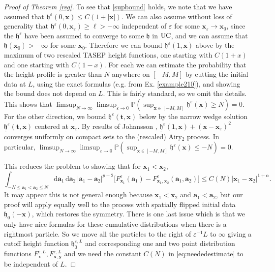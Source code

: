 \documentclass[letterpaper,reqno,11pt,oneside,final]{amsart}
\theoremstyle{definition}
\newcommand{\fh}{\mathfrak{h}}
\newcommand{\pp}{\mathbb{P}}
\newcommand{\ep}{\varepsilon}
\newcommand{\uptext}[1]{\text{\upshape{#1}}}
\DeclareMathOperator{\UC}{\uptext{UC}}
\renewcommand{\d}{\mathrm{d}}
\newcommand{\ft}{\mathbf{t}}
\newcommand{\fx}{\mathbf{x}}
\newcommand{\fy}{\mathbf{y}}
\newcommand{\fa}{\mathbf{a}}
\numberwithin{equation}{section}
\begin{document}
\begin{proof}[Proof of Theorem \ref{reg}]
To see that \eqref{supbound} holds, we note that we have assumed that $\fh^\ep(0,\fx) \le C(1+|\fx|)$.
We can also assume without loss of generality that $\fh^\ep(0, \fx_\ep) \ge \ell>-\infty$  independent of $\ep$ for some $\fx_\ep\longrightarrow\fx_0$, since the $\fh^\ep$ have been assumed to converge to some $\fh$ in $\UC$, and we can assume that $\fh(\fx_0)>-\infty$ for some $\fx_0$.
Therefore we can bound $\fh^\ep(1,\fx)$ above by the maximum of two rescaled TASEP height functions, one starting with $C(1+x)$ and one starting with $C(1-x)$.  For each we can estimate the probability that the height profile is  greater than $N$ anywhere on $[-M,M]$ by cutting the initial data at $L$, using the exact formulas (e.g. from Ex. \ref{example210}), and showing the bound does not depend on $L$. This is fairly standard, so we omit the details.
This shows that $\limsup_{N\to\infty}\limsup_{\ep\to0}\pp\!\left( \sup_{\fx\in [-M,M]}\fh^\ep(\fx)\ge N\right)=0$.  For the other direction, we bound $\fh^\ep(\ft, \fx)$ below by the narrow wedge solution $\underline{\fh}^\ep(\ft, \fx)$ centered at $\fx_\ep$. 
By results of Johansson \cite{johansson}, $\underline{\fh}^\ep(1, \fx) +(\fx-\fx_\ep)^2$ converges uniformly on compact sets to the (rescaled) Airy$_2$ process.
In particular, $\limsup_{N\to\infty}\limsup_{\ep\to 0}\pp\!\left( \sup_{\fx\in [-M,M]}\fh^\ep(\fx)\le - N\right)=0$. 
 
This reduces the problem to showing that for  $\fx_1<\fx_2$, 
\begin{equation}\label{eq:neededestimate}
\int_{-N\le \fa_1<\fa_2\le N}\d\fa_1\,\d\fa_2\,|\fa_1-\fa_2|^{p-2} \bigl[F^\ep_{\fx_1}(\fa_1) - F^\ep_{\fx_1, \fx_2}(\fa_1,\fa_2)\bigr]\le C(N)  |\fx_1-\fx_2|^{1+\alpha}.
\end{equation}
It may appear this is not general enough because $\fx_1<\fx_2$ and $\fa_1<\fa_2$, but our proof will apply equally well to the process with spatially flipped initial data $\fh_0(-\fx)$, which restores the symmetry.
There is one last issue which is that we only have nice formulas for these cumulative distributions when there is a rightmost particle.
So we move all the particles to the right of $\ep^{-1}L$ to $\infty$ giving a cutoff height function $\fh_0^{\ep,L}$ and corresponding one and two point distribution functions $F^{\ep,L}_\fx, F^{\ep,L}_{\fx, \fy}$ and we need the constant $C(N)$ in \eqref{eq:neededestimate} to be independent of $L$.


\end{proof}
\end{document}
